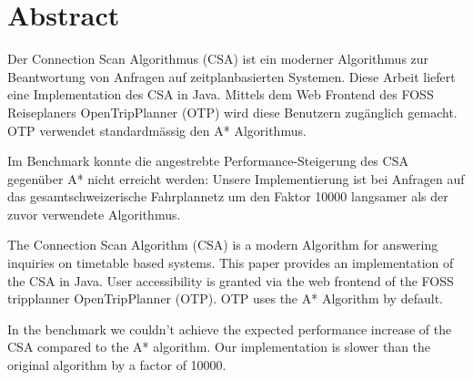 \section{Abstract}
Der Connection Scan Algorithmus (CSA) ist ein moderner  Algorithmus zur Beantwortung von Anfragen auf zeitplanbasierten Systemen. Diese Arbeit liefert eine Implementation des CSA in Java. Mittels dem Web Frontend des FOSS Reiseplaners OpenTripPlanner (OTP) wird diese Benutzern zugänglich gemacht. OTP verwendet standardmässig den A* Algorithmus. 

Im Benchmark konnte die angestrebte Performance-Steigerung des CSA gegenüber A* nicht erreicht werden: Unsere Implementierung ist bei Anfragen auf das gesamtschweizerische Fahrplannetz um den Faktor 10000 langsamer als der zuvor verwendete Algorithmus.

\newpage 

The Connection Scan Algorithm (CSA) is a modern Algorithm for answering inquiries on timetable based systems. This paper provides an implementation of the CSA in Java. User accessibility is granted via the web frontend of the FOSS tripplanner OpenTripPlanner (OTP). OTP uses the A* Algorithm by default.

In the benchmark we couldn’t achieve the expected performance increase of the CSA compared to the A* algorithm. Our implementation is slower than the original algorithm by a factor of 10000.




